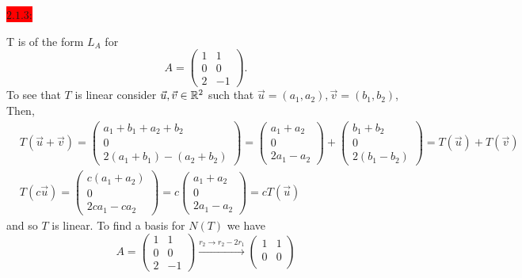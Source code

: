 \documentclass{exam}
\begin{document}
  \colorbox{red}{\underline{$2.1.3$}:}
  \begin{solution}
    T is of the form $L_A$ for 
    \[
      A = \begin{pmatrix}
        1 & 1 \\
        0 & 0 \\
        2 & -1 
      \end{pmatrix}.
    \]
    To see that $T$ is linear consider $\vec{u}, \vec{v} \in \mathbb R^2$ such that $\vec{u} = (a_1, a_2), \vec{v} = (b_1, b_2)$, Then, 
    \begin{align*}
      &T(\vec{u} + \vec{v}) = \begin{pmatrix}
        a_1 + b_1 + a_2 + b_2 \\
        0 \\
        2(a_1 + b_1) - (a_2 + b_2)
      \end{pmatrix}
      = \begin{pmatrix}
        a_1 + a_2 \\
        0 \\
        2a_1 - a_2
      \end{pmatrix}
      + \begin{pmatrix}
        b_1 + b_2 \\
        0 \\
        2(b_1 - b_2)
      \end{pmatrix}
      = T(\vec{u}) + T(\vec{v}) \\
      &T(c\vec{u}) = \begin{pmatrix}
        c(a_1 + a_2) \\
        0 \\
        2ca_1 - ca_2
      \end{pmatrix}
      = c\begin{pmatrix}
        a_1 + a_2 \\
        0 \\
        2a_1 - a_2
      \end{pmatrix}
      = cT(\vec{u})
    \end{align*}
    and so $T$ is linear. To find a basis for $N(T)$ we have 
    \[
      A = \begin{pmatrix}
        1 & 1 \\
        0 & 0 \\
        2 & -1 
      \end{pmatrix} 
      \xrightarrow{r_2 \to r_2 - 2r_1}
      \begin{pmatrix}
        1 & 1 \\
        0 & 0 \\

\end{pmatrix}\]
\end{solution}
\end{document}
